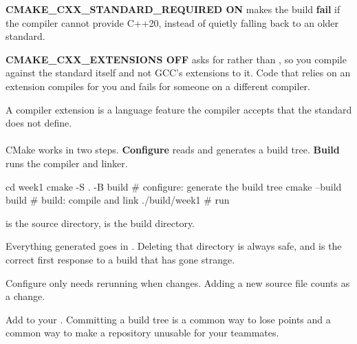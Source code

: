 \documentclass[
    10pt,
    dvipsnames,
    svgnames,
    x11names,
    aspectratio=1610,
    english,
    codeminted]{beamer}
\begin{document}
\begin{frame}{\secname}
\medskip
\begin{MyBox}
\begin{compactitem}
    \item \textbf{CMAKE_CXX_STANDARD_REQUIRED ON} makes the build \textbf{fail} if the compiler cannot provide C++20, instead of quietly falling back to an older standard.
     \item \textbf{CMAKE_CXX_EXTENSIONS OFF} asks for  rather than , so you compile against the standard itself and not GCC's extensions to it. Code that relies on an extension compiles for you and fails for someone on a different compiler.
     \begin{compactitem}
         \item A compiler extension is a language feature the compiler accepts that the standard does not define.
     \end{compactitem}
\end{compactitem}

\end{MyBox}
\end{frame}
\endgroup

\begin{frame}[fragile]{\secname}
\framesubtitle{\subsecname}
CMake works in two steps. \textbf{Configure} reads  and generates a build tree. \textbf{Build} runs the compiler and linker.

\begin{bashcodebasic}[][fontsize=\footnotesize]
cd week1
cmake -S . -B build      # configure: generate the build tree
cmake --build build      # build: compile and link
./build/week1         # run
\end{bashcodebasic}

\begin{compactitem}
\small
    \item {} is the source directory,  is the build directory.
    \item Everything generated goes in . Deleting that directory is always safe, and is the correct first response to a build that has gone strange.
    \item Configure only needs rerunning when  changes. Adding a new source file counts as a change.
\end{compactitem}

\medskip
\begin{MyBox}
Add  to your . Committing a build tree is a common way to lose points and a common way to make a repository unusable for your teammates.
\end{MyBox}
\end{frame}
\end{document}
